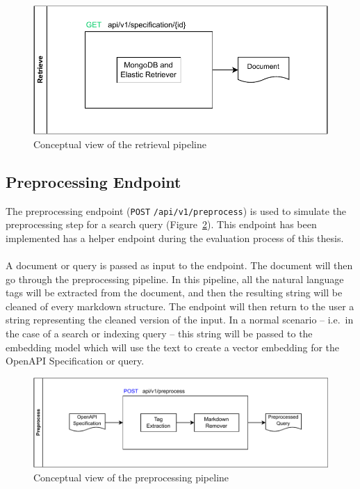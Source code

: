 \begin{figure}[!h]
    \begin{center}
        \includegraphics[width=0.5\linewidth]{assets/pdf/architecture/flow-retrieve}
    \end{center}

    \caption{Conceptual view of the retrieval pipeline}
    \label{fig:flow-retrieve}
\end{figure}

\subsection{Preprocessing Endpoint}\label{subsec:preprocessing-endpoint-1}
The preprocessing endpoint (\verb|POST| \verb|/api/v1/preprocess|) is used to simulate the preprocessing step for a search query (Figure~\ref{fig:flow-preprocess}).
This endpoint has been implemented has a helper endpoint during the evaluation process of this thesis. \\ \\
A document or query is passed as input to the endpoint.
The document will then go through the preprocessing pipeline.
In this pipeline, all the natural language tags will be extracted from the document, and then the resulting string will be cleaned of every markdown structure.
The endpoint will then return to the user a string representing the cleaned version of the input.
In a normal scenario -- i.e.\ in the case of a search or indexing query -- this string will be passed to the embedding model which will use the text to create a vector embedding for the OpenAPI Specification or query.

\begin{figure}[!h]
    \begin{center}
        \includegraphics[width=0.8\linewidth]{assets/pdf/architecture/flow-preprocess}
    \end{center}

    \caption{Conceptual view of the preprocessing pipeline}
    \label{fig:flow-preprocess}
\end{figure}

